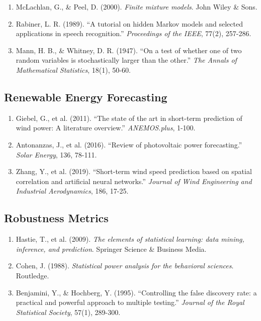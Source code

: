\documentclass[11pt,a4paper]{article}
\begin{document}
\begin{enumerate}
    \item McLachlan, G., \& Peel, D. (2000). \textit{Finite mixture models}. John Wiley \& Sons.
    
    \item Rabiner, L. R. (1989). ``A tutorial on hidden Markov models and selected applications in speech recognition.'' \textit{Proceedings of the IEEE}, 77(2), 257-286.
    
    \item Mann, H. B., \& Whitney, D. R. (1947). ``On a test of whether one of two random variables is stochastically larger than the other.'' \textit{The Annals of Mathematical Statistics}, 18(1), 50-60.
\end{enumerate}

\subsection{Renewable Energy Forecasting}

\begin{enumerate}
    \item Giebel, G., et al. (2011). ``The state of the art in short-term prediction of wind power: A literature overview.'' \textit{ANEMOS.plus}, 1-100.
    
    \item Antonanzas, J., et al. (2016). ``Review of photovoltaic power forecasting.'' \textit{Solar Energy}, 136, 78-111.
    
    \item Zhang, Y., et al. (2019). ``Short-term wind speed prediction based on spatial correlation and artificial neural networks.'' \textit{Journal of Wind Engineering and Industrial Aerodynamics}, 186, 17-25.
\end{enumerate}

\subsection{Robustness Metrics}

\begin{enumerate}
    \item Hastie, T., et al. (2009). \textit{The elements of statistical learning: data mining, inference, and prediction}. Springer Science \& Business Media.
    
    \item Cohen, J. (1988). \textit{Statistical power analysis for the behavioral sciences}. Routledge.
    
    \item Benjamini, Y., \& Hochberg, Y. (1995). ``Controlling the false discovery rate: a practical and powerful approach to multiple testing.'' \textit{Journal of the Royal Statistical Society}, 57(1), 289-300.
\end{enumerate}
\end{document}
